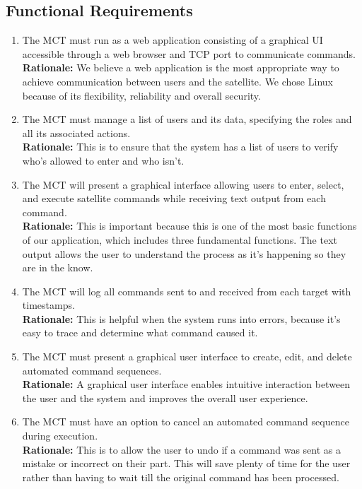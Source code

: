 \documentclass[12pt]{article}
\begin{document}
\subsection{Functional Requirements}
\begin{enumerate}
    \item The MCT must run as a web application consisting of a graphical UI accessible through a web browser and TCP port to communicate commands. \\
    \textbf{Rationale:} We believe a web application is the most appropriate way to achieve communication between users and the satellite. We chose Linux because of its flexibility, reliability and overall security. 
    \item The MCT must manage a list of users and its data, specifying the roles and all its associated actions. \\
    \textbf{Rationale:} This is to ensure that the system has a list of users to verify who’s allowed to enter and who isn’t. 
    \item The MCT will present a graphical interface allowing users to enter, select, and execute satellite commands while receiving text output from each command. \\
    \textbf{Rationale:} This is important because this is one of the most basic functions of our application, which includes three fundamental functions. The text output allows the user to understand the process as it’s happening so they are in the know. 
    \item  The MCT will log all commands sent to and received from each target with timestamps. \\
    \textbf{Rationale:} This is helpful when the system runs into errors, because it’s easy to trace and determine what command caused it. 
    \item The MCT must present a graphical user interface to create, edit, and delete automated command sequences. \\
    \textbf{Rationale:} A graphical user interface enables intuitive interaction between the user and the system and improves the overall user experience. 
    \item The MCT must have an option to cancel an automated command sequence during execution. \\
    \textbf{Rationale:} This is to allow the user to undo if a command was sent as a mistake or incorrect on their part. This will save plenty of time for the user rather than having to wait till the original command has been processed. 

\end{enumerate}
\end{document}
